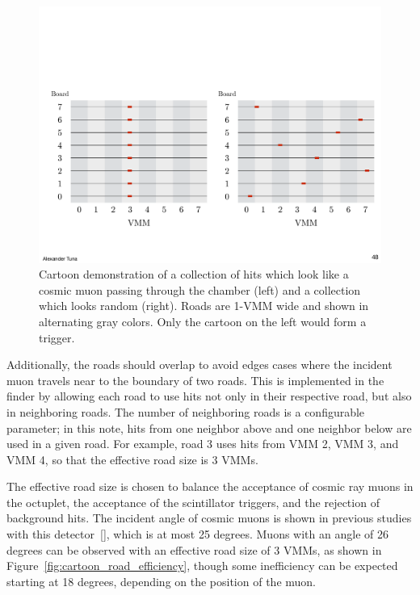\begin{figure}[!htpb]
  \begin{center}
    \includegraphics[width=1.0\textwidth]{figures/cartoons/cartoon_road_demo}
  \end{center}
  \vspace{-20pt}
  \caption{Cartoon demonstration of a collection of hits which look like a cosmic muon passing through the chamber (left) and a collection which looks random (right). Roads are 1-VMM wide and shown in alternating gray colors. Only the cartoon on the left would form a trigger.}
  \label{fig:cartoon_road_demo}
\end{figure}

Additionally, the roads should overlap to avoid edges cases where the incident muon travels near to the boundary of two roads. This is implemented in the finder by allowing each road to use hits not only in their respective road, but also in neighboring roads. The number of neighboring roads is a configurable parameter; in this note, hits from one neighbor above and one neighbor below are used in a given road. For example, road 3 uses hits from VMM 2, VMM 3, and VMM 4, so that the effective road size is 3 VMMs.

The effective road size is chosen to balance the acceptance of cosmic ray muons in the octuplet, the acceptance of the scintillator triggers, and the rejection of background hits. The incident angle of cosmic muons is shown in previous studies with this detector~\ref{}, which is at most 25 degrees. Muons with an angle of 26 degrees can be observed with an effective road size of 3 VMMs, as shown in Figure~\ref{fig:cartoon_road_efficiency}, though some inefficiency can be expected starting at 18 degrees, depending on the position of the muon.

